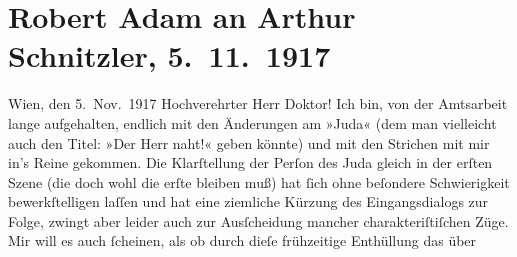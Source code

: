 

         
         \renewcommand{\erwaehntePersonen}{Personen: Robert Adam, Titus Livius}
         \renewcommand{\erwaehnteOrte}{Orte: Griechenland, Ostia Antica, Rom, Wien}
         \renewcommand{\erwaehnteWerke}{Werke: Das Ende des Judas}
               \section[Robert Adam an Arthur Schnitzler, 5. 11. 1917]{ Robert Adam an Arthur Schnitzler, 5. 11. 1917}\nopagebreak{}\rehead{ }\begin{ledgroupsized}[t]{13cm}\normalsize\beginnumbering{} \toendnotes[C]{\smallbreak\pagebreak[2]} 
\pstart
           \raggedleft{}{\pb}Wien, den 5. Nov. 1917\pend
           \pstart\center{}Hochverehrter Herr Doktor!\pend\pstart
           Ich bin, von der Amtsarbeit lange aufgehalten, endlich mit den Änderungen am »Juda« (dem man vielleicht auch den Titel: »Der
               Herr naht!« geben könnte) und mit den Strichen mit mir in’s Reine gekommen. Die
               Klarſtellung der Perſon des Juda gleich in der erſten Szene (die doch wohl die erſte
               bleiben muß) hat ſich ohne beſondere Schwierigkeit bewerkſtelligen laſſen und hat
               eine ziemliche Kürzung des Eingangsdialogs zur Folge, zwingt aber leider auch zur
               Ausſcheidung mancher charakteriſtiſchen Züge. Mir will es auch ſcheinen,  als ob durch dieſe frühzeitige Enthüllung das über

\end{ledgroupsized}
